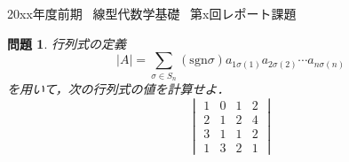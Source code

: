 \documentclass[12pt,leqno]{jsarticle}
\theoremstyle{plain}
\newtheorem{question}{問題}
\def\Rnum#1{\uppercase\expandafter{\romannumeral #1}}
\begin{document}
\begin{center}
{\Large 20xx年度前期 \, 線型代数学基礎\Rnum{1} \, 第x回レポート課題}
\vspace{20pt}
\end{center}

\begin{question}
  行列式の定義
  \[
  \vert A\vert =\sum_{\sigma \in S_n} (\mathrm{sgn}\sigma) a_{1\sigma(1)} a_{2\sigma(2)}\cdots a_{n\sigma(n)}
  \]
  を用いて，次の行列式の値を計算せよ．
  \[
  \begin{vmatrix}
    1 & 0 & 1 & 2 \\
    2 & 1 & 2 & 4 \\
    3 & 1 & 1 & 2 \\
    1 & 3 & 2 & 1
  \end{vmatrix} 
  \]
\end{question}
\end{document}
